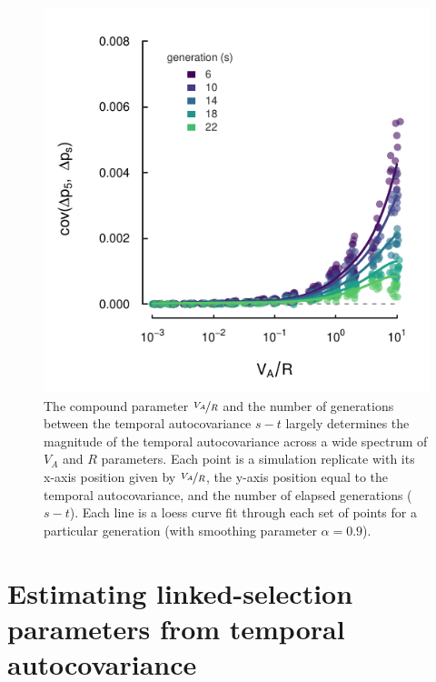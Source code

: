 \documentclass[11pt]{article}
\begin{document}
\begin{figure}[!ht]
  \centering
  \includegraphics{./images/va-r-cov.pdf}
  \caption{The compound parameter $\nicefrac{V_A}{R}$ and the number of
    generations between the temporal autocovariance $s-t$ largely determines the
    magnitude of the temporal autocovariance across a wide spectrum of $V_A$
    and $R$ parameters. Each point is a simulation replicate with its x-axis
  position given by $\nicefrac{V_A}{R}$, the y-axis position equal to the
  temporal autocovariance, and the number of elapsed generations ($s-t$). Each
  line is a loess curve fit through each set of points for a particular generation
(with smoothing parameter $\alpha = 0.9$).}

\label{fig:multilocus-va-r}
\end{figure}

\section{Estimating linked-selection parameters from temporal autocovariance}  
\label{sec:meth-moments}
\end{document}

